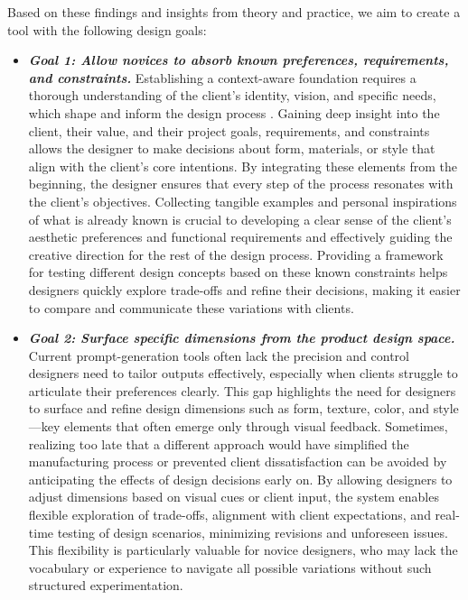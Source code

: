 Based on these findings and insights from theory and practice, we aim to create a tool with the following design goals:
\begin{itemize}
    \item \textbf{\textit{Goal 1: Allow novices to absorb known preferences, requirements, and constraints.}} Establishing a context-aware foundation requires a thorough understanding of the client’s identity, vision, and specific needs, which shape and inform the design process \cite{palani2022interweave}. Gaining deep insight into the client, their value, and their project goals, requirements, and constraints allows the designer to make decisions about form, materials, or style that align with the client’s core intentions. By integrating these elements from the beginning, the designer ensures that every step of the process resonates with the client’s objectives. Collecting tangible examples and personal inspirations of what is already known is crucial to developing a clear sense of the client’s aesthetic preferences and functional requirements and effectively guiding the creative direction for the rest of the design process. Providing a framework for testing different design concepts based on these known constraints helps designers quickly explore trade-offs and refine their decisions, making it easier to compare and communicate these variations with clients.
    \item \textbf{\textit{Goal 2: Surface specific dimensions from the product design space.}} Current prompt-generation tools often lack the precision and control designers need to tailor outputs effectively, especially when clients struggle to articulate their preferences clearly. This gap highlights the need for designers to surface and refine design dimensions such as form, texture, color, and style—key elements that often emerge only through visual feedback. Sometimes, realizing too late that a different approach would have simplified the manufacturing process or prevented client dissatisfaction can be avoided by anticipating the effects of design decisions early on. By allowing designers to adjust dimensions based on visual cues or client input, the system enables flexible exploration of trade-offs, alignment with client expectations, and real-time testing of design scenarios, minimizing revisions and unforeseen issues. This flexibility is particularly valuable for novice designers, who may lack the vocabulary or experience to navigate all possible variations without such structured experimentation.

\end{itemize}
